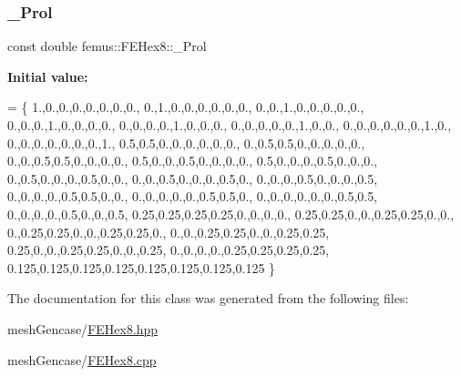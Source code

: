 \subsubsection{\texorpdfstring{\+\_\+\+Prol}{\_Prol}}
{\footnotesize\ttfamily const double femus\+::\+F\+E\+Hex8\+::\+\_\+\+Prol\hspace{0.3cm}{\ttfamily [static]}}

{\bfseries Initial value\+:}
\begin{DoxyCode}
= \{ 
   1.,0.,0.,0.,0.,0.,0.,0.,
   0.,1.,0.,0.,0.,0.,0.,0.,
   0.,0.,1.,0.,0.,0.,0.,0.,
   0.,0.,0.,1.,0.,0.,0.,0.,
   0.,0.,0.,0.,1.,0.,0.,0.,
   0.,0.,0.,0.,0.,1.,0.,0.,
   0.,0.,0.,0.,0.,0.,1.,0.,
   0.,0.,0.,0.,0.,0.,0.,1.,
   0.5,0.5,0.,0.,0.,0.,0.,0.,
   0.,0.5,0.5,0.,0.,0.,0.,0.,
   0.,0.,0.5,0.5,0.,0.,0.,0.,
   0.5,0.,0.,0.5,0.,0.,0.,0.,  
   0.5,0.,0.,0.,0.5,0.,0.,0.,
   0.,0.5,0.,0.,0.,0.5,0.,0.,
   0.,0.,0.5,0.,0.,0.,0.5,0.,  
   0.,0.,0.,0.5,0.,0.,0.,0.5,
   0.,0.,0.,0.,0.5,0.5,0.,0.,
   0.,0.,0.,0.,0.,0.5,0.5,0.,
   0.,0.,0.,0.,0.,0.,0.5,0.5,
   0.,0.,0.,0.,0.5,0.,0.,0.5,
   0.25,0.25,0.25,0.25,0.,0.,0.,0.,
   0.25,0.25,0.,0.,0.25,0.25,0.,0., 
   0.,0.25,0.25,0.,0.,0.25,0.25,0.,
   0.,0.,0.25,0.25,0.,0.,0.25,0.25,
   0.25,0.,0.,0.25,0.25,0.,0.,0.25,
   0.,0.,0.,0.,0.25,0.25,0.25,0.25,
   0.125,0.125,0.125,0.125,0.125,0.125,0.125,0.125
   \}
\end{DoxyCode}


The documentation for this class was generated from the following files\+:\begin{DoxyCompactItemize}
\item 
mesh\+Gencase/\mbox{\hyperlink{_f_e_hex8_8hpp}{F\+E\+Hex8.\+hpp}}\item 
mesh\+Gencase/\mbox{\hyperlink{_f_e_hex8_8cpp}{F\+E\+Hex8.\+cpp}}\end{DoxyCompactItemize}
